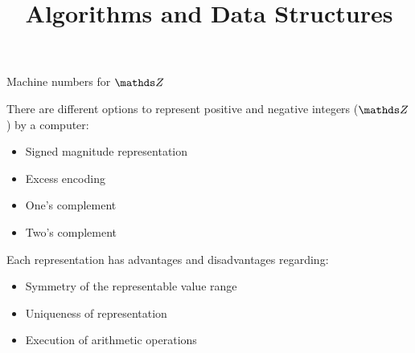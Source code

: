 \documentclass[11pt,compress,t,notes=noshow, xcolor=table]{beamer}
\title{Algorithms and Data Structures}
\begin{document}



\begin{vbframe}{Machine numbers for $\Z$}


%
There are different options to represent positive and negative integers ($\Z$) by a computer:
\begin{itemize}
  \item Signed magnitude representation
  \item Excess encoding
  \item One's complement
  \item Two's complement
\end{itemize}

\lz 


Each representation has advantages and disadvantages regarding:
\begin{itemize}
  \item Symmetry of the representable value range
  \item Uniqueness of representation
  \item Execution of arithmetic operations
\end{itemize}
\end{vbframe}
\end{document}
